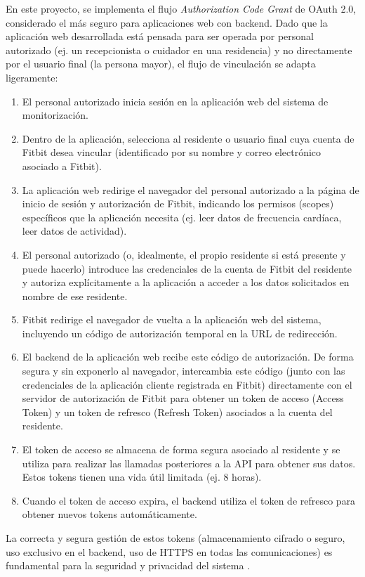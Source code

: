 En este proyecto, se implementa el flujo \textit{Authorization Code Grant} de OAuth 2.0, considerado el más seguro para aplicaciones web con backend. Dado que la aplicación web desarrollada está pensada para ser operada por personal autorizado (ej. un recepcionista o cuidador en una residencia) y no directamente por el usuario final (la persona mayor), el flujo de vinculación se adapta ligeramente:
\begin{enumerate}
    \item El personal autorizado inicia sesión en la aplicación web del sistema de monitorización.
    \item Dentro de la aplicación, selecciona al residente o usuario final cuya cuenta de Fitbit\textsuperscript{\textregistered} desea vincular (identificado por su nombre y correo electrónico asociado a Fitbit\textsuperscript{\textregistered}).
    \item La aplicación web redirige el navegador del personal autorizado a la página de inicio de sesión y autorización de Fitbit\textsuperscript{\textregistered}, indicando los permisos (scopes) específicos que la aplicación necesita (ej. leer datos de frecuencia cardíaca, leer datos de actividad).
    \item El personal autorizado (o, idealmente, el propio residente si está presente y puede hacerlo) introduce las credenciales de la cuenta de Fitbit\textsuperscript{\textregistered} del residente y autoriza explícitamente a la aplicación a acceder a los datos solicitados en nombre de ese residente.
    \item Fitbit\textsuperscript{\textregistered} redirige el navegador de vuelta a la aplicación web del sistema, incluyendo un código de autorización temporal en la URL de redirección.
    \item El backend de la aplicación web recibe este código de autorización. De forma segura y sin exponerlo al navegador, intercambia este código (junto con las credenciales de la aplicación cliente registrada en Fitbit\textsuperscript{\textregistered}) directamente con el servidor de autorización de Fitbit\textsuperscript{\textregistered} para obtener un token de acceso (Access Token) y un token de refresco (Refresh Token) asociados a la cuenta del residente.
    \item El token de acceso se almacena de forma segura asociado al residente y se utiliza para realizar las llamadas posteriores a la API para obtener sus datos. Estos tokens tienen una vida útil limitada (ej. 8 horas).
    \item Cuando el token de acceso expira, el backend utiliza el token de refresco para obtener nuevos tokens automáticamente.
\end{enumerate}
La correcta y segura gestión de estos tokens (almacenamiento cifrado o seguro, uso exclusivo en el backend, uso de HTTPS en todas las comunicaciones) es fundamental para la seguridad y privacidad del sistema \cite{oauth_security_bcp_rfc8252}.

